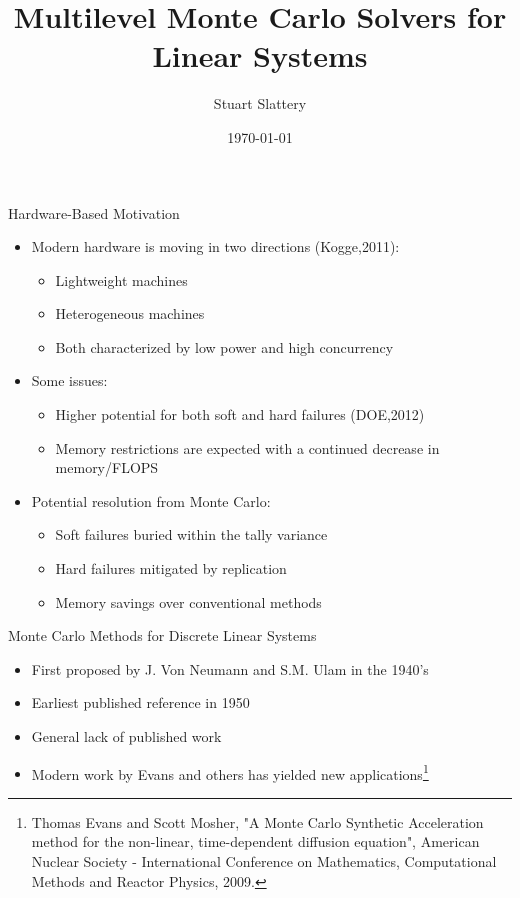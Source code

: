 \documentclass{beamer}
\author{Stuart Slattery}
\date{\today}
\title[Multilevel Monte Carlo Solvers for Linear Systems \hspace{1mm}
  \insertframenumber/\inserttotalframenumber]{Multilevel Monte Carlo
  Solvers for Linear Systems}
\begin{document}
\maketitle

\begin{frame}{Hardware-Based Motivation}

  \begin{itemize}
  \item Modern hardware is moving in two directions (Kogge,2011):
    \begin{itemize}
    \item Lightweight machines
    \item Heterogeneous machines
    \item Both characterized by low power and high concurrency
    \end{itemize}
    \medskip \medskip
  \item Some issues:
    \begin{itemize}
    \item Higher potential for both soft and hard failures (DOE,2012)
    \item Memory restrictions are expected with a continued decrease
      in memory/FLOPS
    \end{itemize}
    \medskip \medskip
  \item Potential resolution from Monte Carlo:
    \begin{itemize}
    \item Soft failures buried within the tally variance
    \item Hard failures mitigated by replication
    \item Memory savings over conventional methods
    \end{itemize}
  \end{itemize}

\end{frame}

\begin{frame}{Monte Carlo Methods for Discrete Linear Systems}

  \begin{itemize}
  \item First proposed by J. Von Neumann and S.M. Ulam in the 1940's
    \medskip \medskip
  \item Earliest published reference in 1950
    \medskip \medskip
  \item General lack of published work
    \medskip \medskip
  \item Modern work by Evans and others has yielded new
    applications\let\thefootnote\relax\footnote{\tiny{Thomas Evans and
        Scott Mosher, "A Monte Carlo Synthetic Acceleration method for
        the non-linear, time-dependent diffusion equation", American
        Nuclear Society - International Conference on Mathematics,
        Computational Methods and Reactor Physics, 2009.}}
  \end{itemize}

\end{frame}
\end{document}

